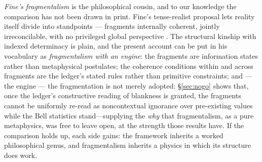 \emph{Fine's fragmentalism} is the philosophical cousin, and to our knowledge the comparison has not been drawn in print. Fine's tense-realist proposal lets reality itself divide into standpoints --- fragments internally coherent, jointly irreconcilable, with no privileged global perspective \cite{fine2005tense}. The structural kinship with indexed determinacy is plain, and the present account can be put in his vocabulary as \emph{fragmentalism with an engine}: the fragments are information states rather than metaphysical postulates; the coherence conditions within and across fragments are the ledger's stated rules rather than primitive constraints; and --- the engine --- the fragmentation is not merely adopted: \S\ref{sec:nogo} shows that, once the ledger's constructive reading of blankness is granted, the fragments cannot be uniformly re-read as noncontextual ignorance over pre-existing values while the Bell statistics stand---supplying the \emph{why} that fragmentalism, as a pure metaphysics, was free to leave open, at the strength those results have. If the comparison holds up, each side gains: the framework inherits a worked philosophical genus, and fragmentalism inherits a physics in which its structure does work.

